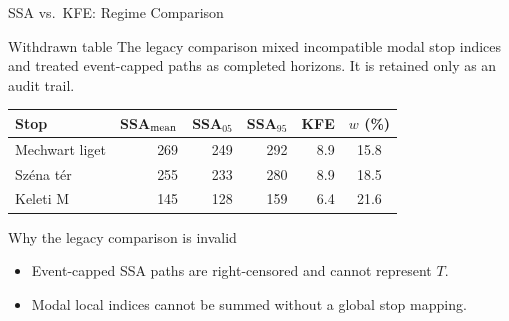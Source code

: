 \documentclass[aspectratio=169,12pt]{beamer}
\begin{document}
\begin{frame}{SSA vs.\ KFE: Regime Comparison}
\begin{alertblock}{Withdrawn table}
The legacy comparison mixed incompatible modal stop indices and treated
event-capped paths as completed horizons. It is retained only as an audit trail.
\end{alertblock}
\begin{center}
\begin{tabular}{lrrrrc}
\toprule
Stop & SSA$_{\rm mean}$ & SSA$_{05}$ & SSA$_{95}$ & KFE & $w$ (\%) \\
\midrule
Mechwart liget & 269 & 249 & 292 & 8.9 & 15.8 \\
Széna tér      & 255 & 233 & 280 & 8.9 & 18.5 \\
Keleti M       & 145 & 128 & 159 & 6.4 & 21.6 \\
\bottomrule
\end{tabular}
\end{center}

\begin{block}{Why the legacy comparison is invalid}
\begin{itemize}
  \item Event-capped SSA paths are right-censored and cannot represent $T$.
  \item Modal local indices cannot be summed without a global stop mapping.
\end{itemize}
\end{block}
\end{frame}
\end{document}
